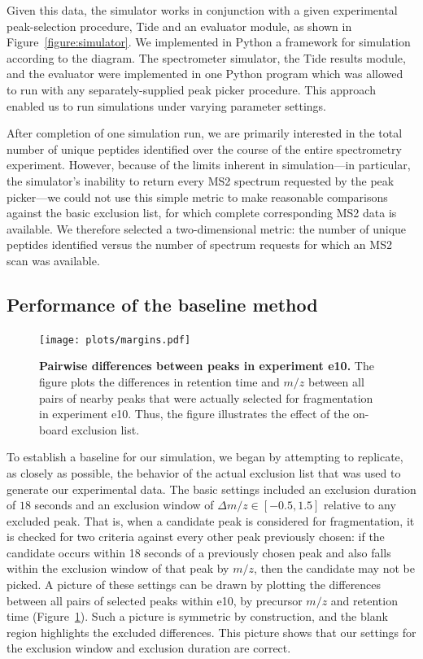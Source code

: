 \documentclass[12pt]{article}
\begin{document}
Given this data, the simulator works in conjunction with a given
experimental peak-selection procedure, Tide and an evaluator module,
as shown in Figure~\ref{figure:simulator}. We implemented in Python a
framework for simulation according to the diagram. The spectrometer
simulator, the Tide results module, and the evaluator were implemented
in one Python program which was allowed to run with any
separately-supplied peak picker procedure. This approach enabled us to
run simulations under varying parameter settings.

After completion of one simulation run, we are primarily interested in
the total number of unique peptides identified over the course of the
entire spectrometry experiment. However, because of the limits
inherent in simulation---in particular, the simulator's inability to
return every MS2 spectrum requested by the peak picker---we could not use this simple
metric to make reasonable comparisons against the basic exclusion
list, for which complete corresponding MS2 data is available.  We
therefore selected a two-dimensional metric: the number of unique
peptides identified versus the number of spectrum requests for which
an MS2 scan was available.

\subsection*{Performance of the baseline method}

\begin{figure}
\centering
\texttt{[image: plots/margins.pdf]}
\caption{{\bf Pairwise differences between peaks in experiment e10.}
  The figure plots the differences in retention time and $m/z$ between
  all pairs of nearby peaks that were actually selected for
  fragmentation in experiment e10. Thus, the figure illustrates the
  effect of the on-board exclusion list.
  \label{figure:deltas}}
\end{figure}

To establish a baseline for our simulation, we began by attempting to replicate, as closely as possible, the behavior of the actual exclusion list that was used to generate our experimental data.  The basic settings included an exclusion duration of  $18$ seconds and an exclusion window of $\Delta m/z \in [-0.5, 1.5]$ relative to any excluded peak.  That is, when a candidate peak is considered for fragmentation, it is checked
for two criteria against every other peak previously chosen: if the candidate
occurs within 18 seconds of a previously chosen peak and also falls within the
exclusion window of that peak by $m/z$, then the candidate may not be picked. A
picture of these settings can be drawn by plotting the differences between all
pairs of selected peaks within e10, by precursor $m/z$ and retention time
(Figure~\ref{figure:deltas}). Such a picture is symmetric by construction, and
the blank region highlights the excluded differences. This picture shows that
our settings for the exclusion window and exclusion duration are correct.
\end{document}
